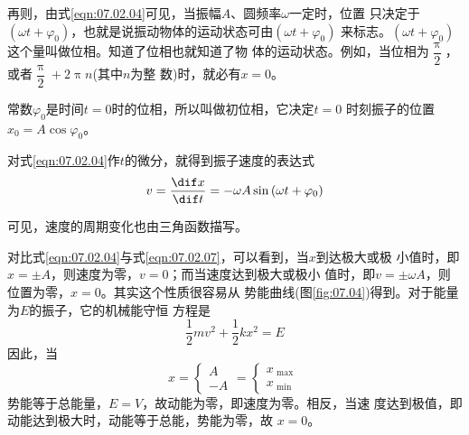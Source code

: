 \documentclass[../outline-of-mechanics.tex]{subfiles}
\begin{document}
再则，由式\eqref{eqn:07.02.04}可见，当振幅$ A $、圆频率$ \omega $一定时，位置
只决定于$ \left( \omega t + \varphi _ { 0 } \right) $，也就是说振动物体的运动状态可由$ \left( \omega t + \varphi _ { 0 } \right) $
来标志。$ \left( \omega t + \varphi _ { 0 } \right) $这个量叫做位相。知道了位相也就知道了物
体的运动状态。例如，当位相为$ \dfrac { \uppi } { 2 } $，或者$ \dfrac { \uppi } { 2 } + 2 \uppi n $(其中$ n $为整
数)时，就必有$ x = 0 $。

常数$ \varphi _ { 0 } $是时间$ t = 0 $时的位相，所以叫做初位相，它决定$ t = 0 $
时刻振子的位置$ x _ { 0 } = A \cos \varphi _ { 0 } $。

对式\eqref{eqn:07.02.04}作$ t $的微分，就得到振子速度的表达式
\begin{equation}\label{eqn:07.02.07}
  v = \frac { \dif x } { \dif t } = - \omega A \sin \left( \omega t + \varphi _ { 0 } \right)
\end{equation}

可见，速度的周期变化也由三角函数描写。

对比式\eqref{eqn:07.02.04}与式\eqref{eqn:07.02.07}，可以看到，当$ x $到达极大或极
小值时，即$ x = \pm A $，则速度为零，$ v = 0 $；而当速度达到极大或极小
值时，即$ v = \pm \omega A $，则位置为零，$ x = 0 $。其实这个性质很容易从
势能曲线(图\ref{fig:07.04})得到。对于能量为$ E $的振子，它的机械能守恒
方程是
\begin{equation*}
  \frac { 1 } { 2 } m v ^ { 2 } + \frac { 1 } { 2 } k x ^ { 2 } = E
\end{equation*}
因此，当
\begin{equation*}
  x =
  \begin{cases}
    A \\
    -A
  \end{cases}
  =
  \begin{cases}
    x _ { \text { max } } \\
    x _ { \text { min } }
  \end{cases}
\end{equation*}
\clearpage\noindent
势能等于总能量，$ E = V $，故动能为零，即速度为零。相反，当速
度达到极值，即动能达到极大时，动能等于总能，势能为零，故
$ x = 0 $。
\end{document}

